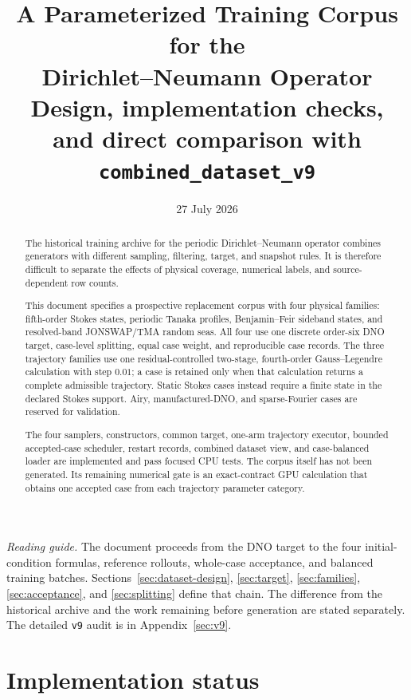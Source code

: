 \documentclass[11pt]{article}
\title{A Parameterized Training Corpus for the\\
Dirichlet--Neumann Operator\\[0.4em]
\large Design, implementation checks, and direct comparison with
\texttt{combined\_dataset\_v9}}
\author{}
\date{27 July 2026}
\begin{document}
\maketitle

\begin{abstract}
The historical training archive for the periodic Dirichlet--Neumann operator
combines generators with different sampling, filtering, target, and snapshot
rules.  It is therefore difficult to separate the effects of physical
coverage, numerical labels, and source-dependent row counts.

This document specifies a prospective replacement corpus with four physical
families: fifth-order Stokes states, periodic Tanaka profiles,
Benjamin--Feir sideband states, and resolved-band JONSWAP/TMA random seas.
All four use one discrete order-six DNO target, case-level splitting, equal
case weight, and reproducible case records.  The three trajectory families
use one residual-controlled two-stage, fourth-order Gauss--Legendre
calculation with step \(0.01\); a case is retained only when that calculation
returns a complete admissible trajectory.  Static Stokes cases instead
require a finite state in the declared Stokes support.  Airy,
manufactured-DNO, and sparse-Fourier cases are reserved for validation.

The four samplers, constructors, common target, one-arm trajectory executor,
bounded accepted-case scheduler, restart records, combined dataset view, and
case-balanced loader are implemented and pass focused CPU tests.  The corpus
itself has not been generated.  Its remaining numerical gate is an
exact-contract GPU calculation that obtains one accepted case from each
trajectory parameter category.
\end{abstract}

\tableofcontents
\clearpage

\noindent\textit{Reading guide.}
The document proceeds from the DNO target to the four initial-condition
formulas, reference rollouts, whole-case acceptance, and balanced training
batches.
Sections~\ref{sec:dataset-design}, \ref{sec:target}, \ref{sec:families},
\ref{sec:acceptance}, and \ref{sec:splitting} define that chain.  The
difference from the historical archive and the work remaining before
generation are stated separately.  The
detailed \texttt{v9} audit is in Appendix~\ref{sec:v9}.

\section*{Implementation status}
\end{document}
